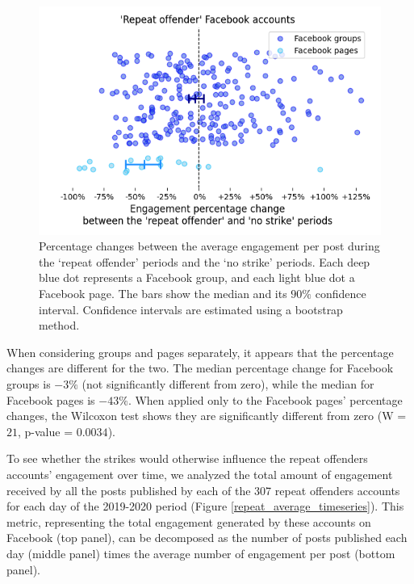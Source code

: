 \documentclass[11pt,a4paper]{article}
\begin{document}
\begin{figure}[!h]
\centering
\includegraphics[width=\linewidth]{./../figure/repeat_vs_free_percentage_change.png}
\caption{Percentage changes between the average engagement per post during the `repeat offender' periods and the `no strike' periods. 
Each deep blue dot represents a Facebook group, and each light blue dot a Facebook page.
The bars show the median and its $90\%$ confidence interval.
Confidence intervals are estimated using a bootstrap method.}
\label{repeat_vs_free_percentage_change}
\end{figure}

When considering groups and pages separately, it appears that the percentage changes are different for the two. 
The median percentage change for Facebook groups is $-3\%$ (not significantly different from zero), while the median for Facebook pages is $-43\%$. 
When applied only to the Facebook pages' percentage changes, the Wilcoxon test shows they are significantly different from zero (W = $21$, p-value = $0.0034$).

To see whether the strikes would otherwise influence the repeat offenders accounts' engagement over time, we analyzed the total amount of engagement received by all the posts published by each of the 307 repeat offenders accounts for each day of the 2019-2020 period (Figure \ref{repeat_average_timeseries}). 
This metric, representing the total engagement generated by these accounts on Facebook (top panel), can be decomposed as the number of posts published each day (middle panel) times the average number of engagement per post (bottom panel).
\end{document}
